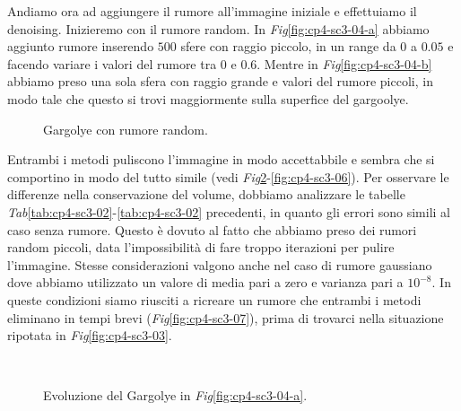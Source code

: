 Andiamo ora ad aggiungere il rumore all'immagine iniziale e
effettuiamo il denoising. Inizieremo con il rumore random. In
\emph{Fig}\ref{fig:cp4-sc3-04-a} abbiamo aggiunto rumore inserendo
$500$ sfere con raggio piccolo, in un range da $0$ a $0.05$ e facendo
variare i valori del rumore tra $0$ e $0.6$. Mentre in
\emph{Fig}\ref{fig:cp4-sc3-04-b} abbiamo preso una sola sfera con
raggio grande e valori del rumore piccoli, in modo tale che questo si trovi maggiormente sulla superfice del gargoolye. 

\begin{figure}[h!tb]
  \centering
  \quad
  \quad
  \caption{Gargolye con rumore random.}
  \label{fig:cp4-sc3-04}
\end{figure}

Entrambi i metodi puliscono l'immagine in modo accettabbile e sembra
che si comportino in modo del tutto simile (vedi
\emph{Fig}\ref{fig:cp4-sc3-05}-\ref{fig:cp4-sc3-06}). Per osservare le
differenze nella conservazione del volume, dobbiamo analizzare le tabelle
\emph{Tab}\ref{tab:cp4-sc3-02}-\ref{tab:cp4-sc3-02} precedenti, in
quanto gli errori sono simili al caso senza rumore. Questo è dovuto al
fatto che abbiamo preso dei rumori random piccoli, data
l'impossibilità di fare troppo iterazioni per pulire
l'immagine. Stesse considerazioni valgono anche nel caso di rumore
gaussiano dove abbiamo utilizzato un valore di media pari a zero e
varianza pari a $10^{-8}$. In queste condizioni siamo riusciti a
ricreare un rumore che entrambi i metodi eliminano in tempi brevi
(\emph{Fig}\ref{fig:cp4-sc3-07}), prima di trovarci nella situazione ripotata in
\emph{Fig}\ref{fig:cp4-sc3-03}. 

\begin{figure}[h!tb]
  \centering
  \quad
  \\
  \quad
  \caption{Evoluzione del Gargolye in \emph{Fig}\ref{fig:cp4-sc3-04-a}.}
  \label{fig:cp4-sc3-05}
\end{figure} 

